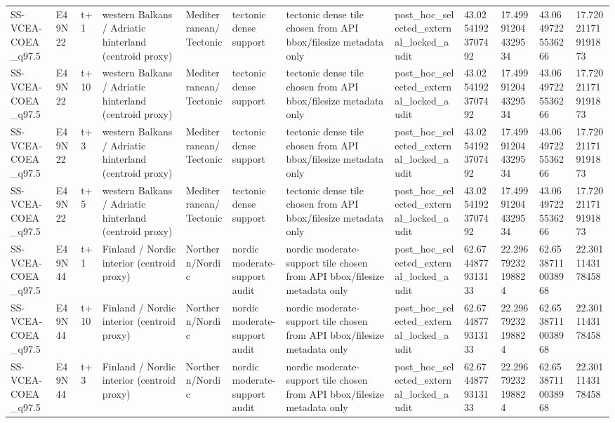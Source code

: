 \begin{landscape}
\begin{longtable}{llllllllllll}
SS-VCEA-COEA\_q97.5 & E49N22 & t+1 & western Balkans / Adriatic hinterland (centroid proxy) & Mediterranean/Tectonic & tectonic dense support & tectonic dense tile chosen from API bbox/filesize metadata only & post\_hoc\_selected\_external\_locked\_audit & 43.02541923707492 & 17.499912044329534 & 43.06497225536266 & 17.720211719191873 \\
SS-VCEA-COEA\_q97.5 & E49N22 & t+10 & western Balkans / Adriatic hinterland (centroid proxy) & Mediterranean/Tectonic & tectonic dense support & tectonic dense tile chosen from API bbox/filesize metadata only & post\_hoc\_selected\_external\_locked\_audit & 43.02541923707492 & 17.499912044329534 & 43.06497225536266 & 17.720211719191873 \\
SS-VCEA-COEA\_q97.5 & E49N22 & t+3 & western Balkans / Adriatic hinterland (centroid proxy) & Mediterranean/Tectonic & tectonic dense support & tectonic dense tile chosen from API bbox/filesize metadata only & post\_hoc\_selected\_external\_locked\_audit & 43.02541923707492 & 17.499912044329534 & 43.06497225536266 & 17.720211719191873 \\
SS-VCEA-COEA\_q97.5 & E49N22 & t+5 & western Balkans / Adriatic hinterland (centroid proxy) & Mediterranean/Tectonic & tectonic dense support & tectonic dense tile chosen from API bbox/filesize metadata only & post\_hoc\_selected\_external\_locked\_audit & 43.02541923707492 & 17.499912044329534 & 43.06497225536266 & 17.720211719191873 \\
SS-VCEA-COEA\_q97.5 & E49N44 & t+1 & Finland / Nordic interior (centroid proxy) & Northern/Nordic & nordic moderate-support audit & nordic moderate-support tile chosen from API bbox/filesize metadata only & post\_hoc\_selected\_external\_locked\_audit & 62.67448779313133 & 22.29679232198824 & 62.65387110038968 & 22.3011143178458 \\
SS-VCEA-COEA\_q97.5 & E49N44 & t+10 & Finland / Nordic interior (centroid proxy) & Northern/Nordic & nordic moderate-support audit & nordic moderate-support tile chosen from API bbox/filesize metadata only & post\_hoc\_selected\_external\_locked\_audit & 62.67448779313133 & 22.29679232198824 & 62.65387110038968 & 22.3011143178458 \\
SS-VCEA-COEA\_q97.5 & E49N44 & t+3 & Finland / Nordic interior (centroid proxy) & Northern/Nordic & nordic moderate-support audit & nordic moderate-support tile chosen from API bbox/filesize metadata only & post\_hoc\_selected\_external\_locked\_audit & 62.67448779313133 & 22.29679232198824 & 62.65387110038968 & 22.3011143178458 \\

\end{longtable}
\end{landscape}
